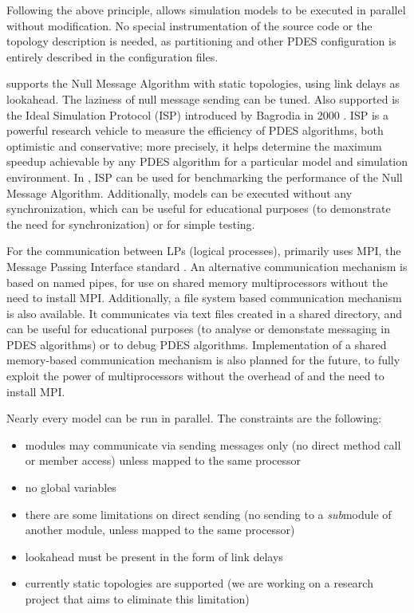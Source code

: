 Following the above principle, {\opp} allows simulation models
to be executed in parallel without modification. No special instrumentation
of the source code or the topology description is needed,
as partitioning and other PDES configuration is entirely described
in the configuration files.

{\opp} supports the Null Message Algorithm with static
topologies, using link delays as lookahead. The laziness of null message
sending can be tuned. Also supported is the Ideal Simulation Protocol
(ISP) introduced by Bagrodia in 2000 \cite{bagrodia00}. ISP is
a powerful research vehicle to measure the efficiency of
PDES algorithms, both optimistic and conservative;
more precisely, it helps determine the maximum speedup achievable
by any PDES algorithm for a particular model and simulation environment.
In {\opp}, ISP can be used for benchmarking the performance of the
Null Message Algorithm.
Additionally, models can be executed without any synchronization, which
can be useful for educational purposes (to demonstrate the need for
synchronization) or for simple testing.

For the communication between LPs (logical processes), {\opp}
primarily uses MPI, the Message Passing Interface standard
\cite{mpiforum94}.  An alternative communication mechanism is based on
named pipes, for use on shared memory multiprocessors without the need
to install MPI.  Additionally, a file system based communication mechanism
is also available. It communicates via text files created in a shared
directory, and can be useful for educational purposes (to analyse or
demonstate messaging in PDES algorithms) or to debug PDES algorithms.
Implementation of a shared memory-based communication mechanism is also planned
for the future, to fully exploit the power of multiprocessors without
the overhead of and the need to install MPI.

Nearly every model can be run in parallel. The constraints are the following:
\begin{itemize}
  \item{modules may communicate via sending messages only (no direct method call
        or member access) unless mapped to the same processor}
  \item{no global variables}
  \item{there are some limitations on direct sending (no sending to a \textit{sub}module
        of another module, unless mapped to the same processor)}
  \item{lookahead must be present in the form of link delays}
  \item{currently static topologies are supported (we are working on a
      research project that aims to eliminate this limitation)}
\end{itemize}

